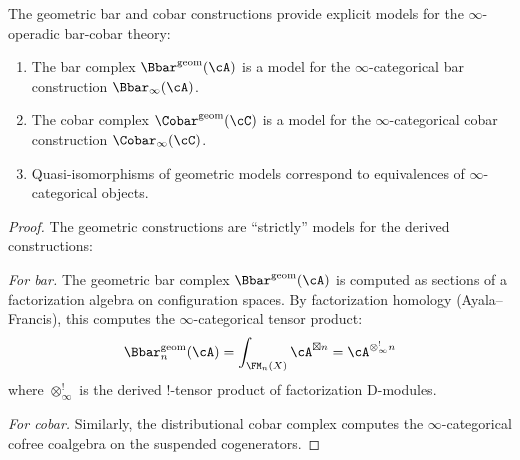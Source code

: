 \begin{theorem}
\label{thm:geometric-infty-operads}
The geometric bar and cobar constructions provide explicit models for the
$\infty$-operadic bar-cobar theory:
\begin{enumerate}[label=(\roman*)]
\item The bar complex $\Bbar^{\mathrm{geom}}(\cA)$ is a model for the
$\infty$-categorical bar construction $\Bbar_\infty(\cA)$.

\item The cobar complex $\Cobar^{\mathrm{geom}}(\cC)$ is a model for the
$\infty$-categorical cobar construction $\Cobar_\infty(\cC)$.

\item Quasi-isomorphisms of geometric models correspond to equivalences of
$\infty$-categorical objects.
\end{enumerate}
\end{theorem}

\begin{proof}
The geometric constructions are ``strictly'' models for the
derived constructions:

\emph{For bar.} The geometric bar complex $\Bbar^{\mathrm{geom}}(\cA)$ is
computed as sections of a factorization algebra on configuration spaces.
By factorization homology (Ayala--Francis), this computes the $\infty$-categorical
tensor product:
\[
\Bbar^{\mathrm{geom}}_n(\cA) = \int_{\FM_n(X)} \cA^{\boxtimes n} = \cA^{\otimes^!_\infty n}
\]
where $\otimes^!_\infty$ is the derived $!$-tensor product of factorization
D-modules.

\emph{For cobar.} Similarly, the distributional cobar complex computes
the $\infty$-categorical cofree coalgebra on the suspended cogenerators.
\end{proof}

